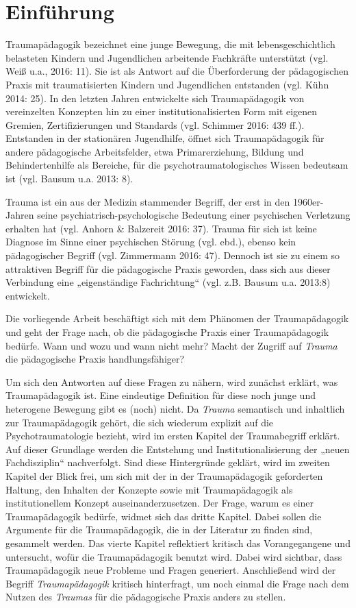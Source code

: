 \section{Einführung}

Traumapädagogik bezeichnet eine junge Bewegung, die mit lebensgeschichtlich belasteten Kindern und Jugendlichen arbeitende Fachkräfte unterstützt (vgl. Weiß u.a., 2016: 11). Sie ist als Antwort auf die Überforderung der pädagogischen Praxis mit traumatisierten Kindern und Jugendlichen entstanden (vgl. Kühn 2014: 25). In den letzten Jahren entwickelte sich Traumapädagogik von vereinzelten Konzepten hin zu einer institutionalisierten Form mit eigenen Gremien, Zertifizierungen und Standards (vgl. Schimmer 2016: 439 ff.). Entstanden in der stationären Jugendhilfe, öffnet sich Traumapädagogik für andere pädagogische Arbeitsfelder, etwa Primarerziehung, Bildung und Behindertenhilfe als Bereiche, für die psychotraumatologisches Wissen bedeutsam ist (vgl. Bausum u.a. 2013: 8).

Trauma ist ein aus der Medizin stammender Begriff, der erst in den 1960er-Jahren seine psychiatrisch-psychologische Bedeutung einer psychischen Verletzung erhalten hat (vgl. Anhorn \& Balzereit 2016: 37). Trauma für sich ist keine Diagnose im Sinne einer psychischen Störung (vgl. ebd.), ebenso kein pädagogischer Begriff (vgl. Zimmermann 2016: 47). Dennoch ist sie zu einem so attraktiven Begriff für die pädagogische Praxis geworden, dass sich aus dieser Verbindung eine „eigenständige Fachrichtung“ (vgl. z.B. Bausum u.a. 2013:8) entwickelt.

Die vorliegende Arbeit beschäftigt sich mit dem Phänomen der Traumapädagogik und geht der Frage nach, ob die pädagogische Praxis einer Traumapädagogik bedürfe. Wann und wozu und wann nicht mehr? Macht der Zugriff auf \textit{Trauma} die pädagogische Praxis handlungsfähiger?

Um sich den Antworten auf diese Fragen zu nähern, wird zunächst erklärt, was Traumapädagogik ist. Eine eindeutige Definition für diese noch junge und heterogene Bewegung gibt es (noch) nicht. Da \textit{Trauma} semantisch und inhaltlich zur Traumapädagogik gehört, die sich wiederum explizit auf die Psychotraumatologie bezieht, wird im ersten Kapitel der Traumabegriff erklärt. Auf dieser Grundlage werden die Entstehung und Institutionalisierung der „neuen Fachdisziplin“ nachverfolgt. Sind diese Hintergründe geklärt, wird im zweiten Kapitel der Blick frei, um sich mit der in der Traumapädagogik geforderten Haltung, den Inhalten der Konzepte sowie mit Traumapädagogik als institutionellem Konzept auseinanderzusetzen. Der Frage, warum es einer Traumapädagogik bedürfe, widmet sich das dritte Kapitel. Dabei sollen die Argumente für die Traumapädagogik, die in der Literatur zu finden sind, gesammelt werden. Das vierte Kapitel reflektiert kritisch das Vorangegangene und untersucht, wofür die Traumapädagogik benutzt wird. Dabei wird sichtbar, dass Traumapädagogik neue Probleme und Fragen generiert. Anschließend wird der Begriff \textit{Traumapädagogik} kritisch hinterfragt, um noch einmal die Frage nach dem Nutzen des \textit{Traumas} für die pädagogische Praxis anders zu stellen.
